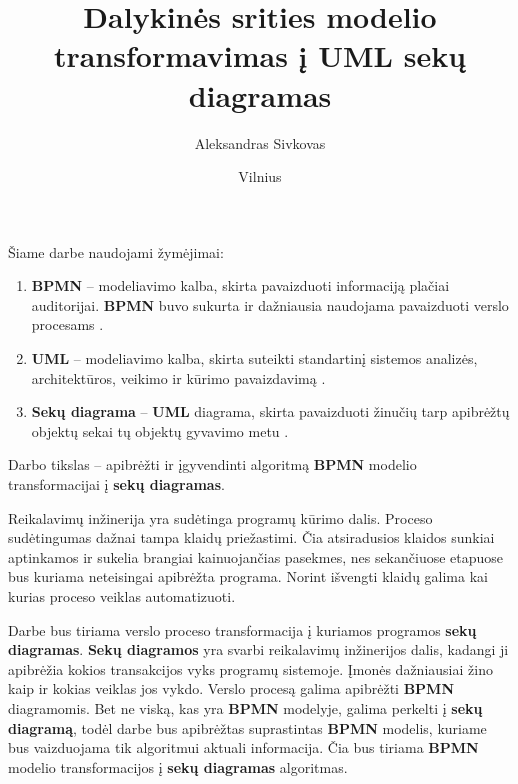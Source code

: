 \documentclass{VUMIFInfBakalaurinis}
\title{Dalykinės srities modelio transformavimas į UML sekų diagramas}
\author{Aleksandras Sivkovas}
\date{Vilnius \\ \the\year}
\begin{document}
\maketitle

\tableofcontents

Šiame darbe naudojami žymėjimai:
\begin{enumerate}
	\item \textbf{BPMN} – modeliavimo kalba, skirta pavaizduoti informaciją plačiai auditorijai. \textbf{BPMN} buvo sukurta ir dažniausia naudojama pavaizduoti verslo procesams \cite{bpmnFormal}.
	\item \textbf{UML} – modeliavimo kalba, skirta suteikti standartinį sistemos analizės, architektūros, veikimo ir kūrimo pavaizdavimą \cite{omgUmlFormal}.
	\item \textbf{Sekų diagrama} – \textbf{UML} diagrama, skirta pavaizduoti žinučių tarp apibrėžtų objektų sekai tų objektų gyvavimo metu \cite{omgUmlFormal}.
\end{enumerate}


Darbo tikslas – apibrėžti ir įgyvendinti algoritmą \textbf{BPMN} modelio transformacijai į \textbf{sekų diagramas}.

Reikalavimų inžinerija yra sudėtinga programų kūrimo dalis. Proceso sudėtingumas dažnai tampa klaidų priežastimi. Čia atsiradusios klaidos sunkiai aptinkamos ir sukelia brangiai kainuojančias pasekmes, nes sekančiuose etapuose bus kuriama neteisingai apibrėžta programa. Norint išvengti klaidų galima kai kurias proceso veiklas automatizuoti.

Darbe bus tiriama verslo proceso transformacija į kuriamos programos \textbf{sekų diagramas}. \textbf{Sekų diagramos} yra svarbi reikalavimų inžinerijos dalis, kadangi ji apibrėžia kokios transakcijos vyks programų sistemoje. Įmonės dažniausiai žino kaip ir kokias veiklas jos vykdo. Verslo procesą galima apibrėžti \textbf{BPMN} diagramomis. Bet ne viską, kas yra \textbf{BPMN} modelyje, galima perkelti į \textbf{sekų diagramą}, todėl darbe bus apibrėžtas suprastintas \textbf{BPMN} modelis, kuriame bus vaizduojama tik algoritmui aktuali informacija. Čia bus tiriama \textbf{BPMN} modelio transformacijos į \textbf{sekų diagramas} algoritmas.
\end{document}
